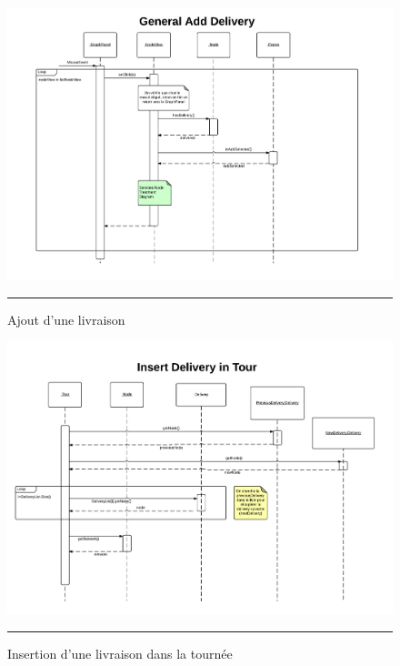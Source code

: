\clearpage
\begin{figure}[H]
	\centering
		\includegraphics[width=\textwidth,height=\textheight,keepaspectratio, angle=90]{Figures/ajout_livraison4}
		\rule{35em}{0.5pt}
	\caption[Ajout d'une livraison]{Ajout d'une livraison}
\end{figure}

\begin{figure}[H]
	\centering
		\includegraphics[width=\textwidth,height=\textheight,keepaspectratio, angle=90]{Figures/ajout_livraison5}
		\rule{35em}{0.5pt}
	\caption[Insertion d'une livraison dans la tournée]{Insertion d'une livraison dans la tournée}
\end{figure}


